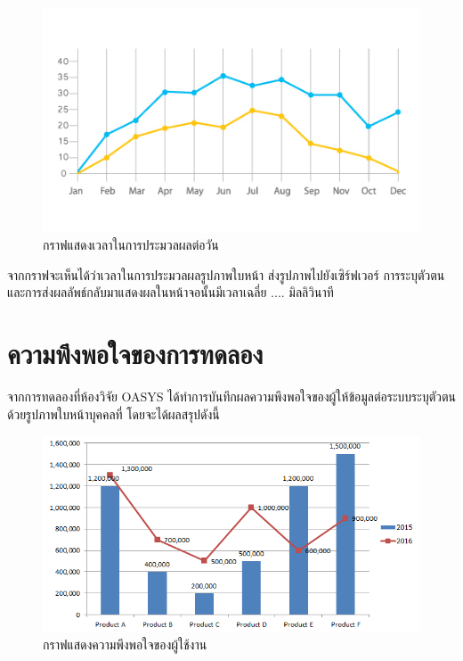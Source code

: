   \begin{figure}[!ht]
      \begin{center}
        \includegraphics[scale=.7]{pic/graph_acc.jpg}
        \caption[Poem]{กราฟแสดงเวลาในการประมวลผลต่อวัน}
        \label{fig:time_graph}
      \end{center}
    \end{figure}
\newpage
\indent จากกราฟจะเห็นได้ว่าเวลาในการประมวลผลรูปภาพใบหน้า ส่งรูปภาพไปยังเซิร์ฟเวอร์ การระบุตัวตน และการส่งผลลัพธ์กลับมาแสดงผลในหน้าจอนั้นมีเวลาเฉลี่ย .... มิลลิวินาที



\section{ความพึงพอใจของการทดลอง}
จากการทดลองที่ห้องวิจัย OASYS ได้ทำการบันทึกผลความพึงพอใจของผู้ให้ข้อมูลต่อระบบระบุตัวตนด้วยรูปภาพใบหน้าบุคคลที่ โดยจะได้ผลสรุปดังนี้

\begin{figure}[!ht]
    \begin{center}
      \includegraphics[scale=.5]{pic/bar_graph.png}
      \caption[bar graph]{กราฟแสดงความพึงพอใจของผู้ใช้งาน}
      \label{fig:bar_graph}
    \end{center}
  \end{figure}